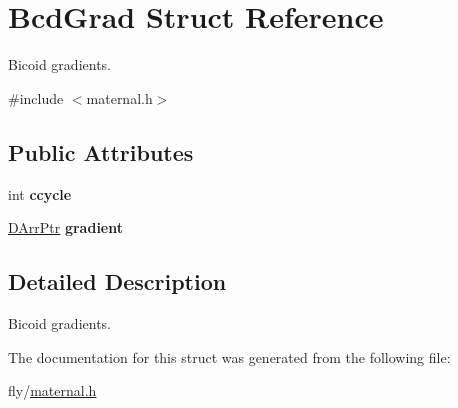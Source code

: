 \hypertarget{structBcdGrad}{
\section{BcdGrad Struct Reference}
\label{structBcdGrad}
}


Bicoid gradients.  


{\ttfamily \#include $<$maternal.h$>$}\subsection*{Public Attributes}
\begin{DoxyCompactItemize}
\item 
\hypertarget{structBcdGrad_a7961d22d5a34590a5b37433f5b44ab52}{
int {\bfseries ccycle}}
\label{structBcdGrad_a7961d22d5a34590a5b37433f5b44ab52}

\item 
\hypertarget{structBcdGrad_a6b89c45d9c436d67fbefe95a9f79d0fe}{
\hyperlink{structDArrPtr}{DArrPtr} {\bfseries gradient}}
\label{structBcdGrad_a6b89c45d9c436d67fbefe95a9f79d0fe}

\end{DoxyCompactItemize}


\subsection{Detailed Description}
Bicoid gradients. 

The documentation for this struct was generated from the following file:\begin{DoxyCompactItemize}
\item 
fly/\hyperlink{maternal_8h}{maternal.h}\end{DoxyCompactItemize}
